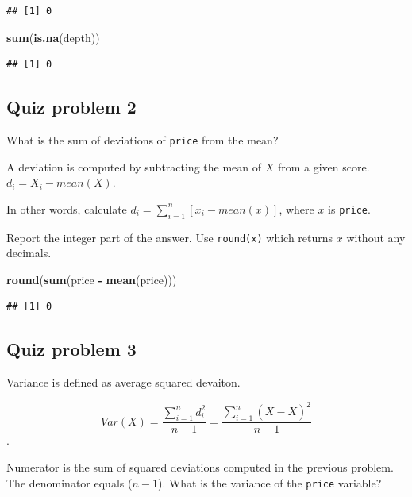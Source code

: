 \documentclass[]{book}
\newenvironment{Shaded}{\begin{snugshade}}{\end{snugshade}}
\newcommand{\KeywordTok}[1]{\textcolor[rgb]{0.13,0.29,0.53}{\textbf{#1}}}
\newcommand{\NormalTok}[1]{#1}
\newcommand{\OperatorTok}[1]{\textcolor[rgb]{0.81,0.36,0.00}{\textbf{#1}}}
\newcommand{\StringTok}[1]{\textcolor[rgb]{0.31,0.60,0.02}{#1}}
\begin{document}
\begin{verbatim}
## [1] 0
\end{verbatim}

\begin{Shaded}
\begin{Highlighting}[]
\KeywordTok{sum}\NormalTok{(}\KeywordTok{is.na}\NormalTok{(depth))}
\end{Highlighting}
\end{Shaded}

\begin{verbatim}
## [1] 0
\end{verbatim}

\hypertarget{quiz-problem-2}{%
\subsection{Quiz problem 2}\label{quiz-problem-2}}

What is the sum of deviations of \texttt{price} from the mean?

A deviation is computed by subtracting the mean of \(X\) from a given score. \(d_i=X_i- mean(X)\).

In other words, calculate \(d_i = \sum_{i=1}^{n}[x_i-mean(x)]\), where \(x\) is \texttt{price}.

Report the integer part of the answer. Use \texttt{round(x)} which returns \(x\) without any decimals.

\begin{Shaded}
\begin{Highlighting}[]
\KeywordTok{round}\NormalTok{(}\KeywordTok{sum}\NormalTok{(price }\OperatorTok{-}\StringTok{ }\KeywordTok{mean}\NormalTok{(price)))}
\end{Highlighting}
\end{Shaded}

\begin{verbatim}
## [1] 0
\end{verbatim}

\hypertarget{quiz-problem-3}{%
\subsection{Quiz problem 3}\label{quiz-problem-3}}

Variance is defined as average squared devaiton.

\[Var(X)=\frac{\sum_{i=1}^n d_i^2}{n-1} =\frac{\sum_{i=1}^n (X-\bar{X})^2}{n-1}\].

Numerator is the sum of squared deviations computed in the previous problem. The denominator equals (\(n-1\)). What is the variance of the \texttt{price} variable?
\end{document}
